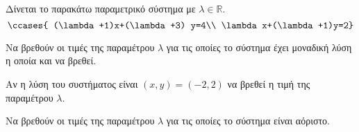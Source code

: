 Δίνεται το παρακάτω παραμετρικό σύστημα με $ \lambda\in\mathbb{R} $.
\[ \ccases{
(\lambda+1)x+(\lambda+3) y=4\\
\lambda x+(\lambda+1)y=2} \]
\begin{rlist}
\item Να βρεθούν οι τιμές της παραμέτρου $ \lambda $ για τις οποίες το σύστημα έχει μοναδική λύση η οποία και να βρεθεί.
\item Αν η λύση του συστήματος είναι $ (x,y)=(-2,2) $ να βρεθεί η τιμή της παραμέτρου $ \lambda $.
\item Να βρεθούν οι τιμές της παραμέτρου $ \lambda $ για τις οποίες το σύστημα είναι αόριστο.
\end{rlist}